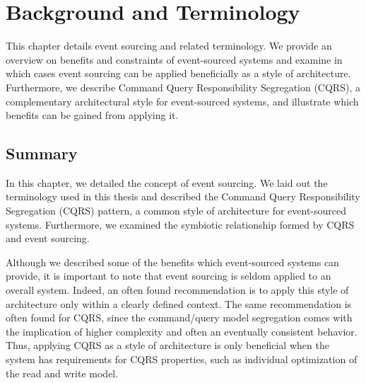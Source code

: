 \chapter{Background and Terminology}
\label{chp:background}

This chapter details event sourcing and related terminology. We provide an 
overview on benefits and constraints of event-sourced systems and examine 
in which cases event sourcing can be applied beneficially as a style of 
architecture. 
Furthermore, we describe Command Query Responsibility Segregation (CQRS), 
a complementary architectural style for event-sourced systems, and illustrate 
which benefits can be gained from applying it.




\section{Summary}
In this chapter, we detailed the concept of event sourcing. We laid out the
terminology used in this thesis and described the Command Query Responsibility 
Segregation (CQRS) pattern, a common style of architecture for event-sourced 
systems. Furthermore, we examined the symbiotic relationship formed by CQRS 
and event sourcing.

Although we described some of the benefits which event-sourced systems can 
provide, it is important to note that event sourcing is seldom applied to an 
overall system. Indeed, an often found recommendation is to apply this style 
of architecture only within a clearly defined context. The same recommendation 
is often found for CQRS, since the command/query model segregation comes with 
the implication of higher complexity and often an eventually consistent 
behavior. Thus, applying CQRS as a style of architecture is only beneficial 
when the system has requirements for CQRS properties, such as individual 
optimization of the read and write model.
